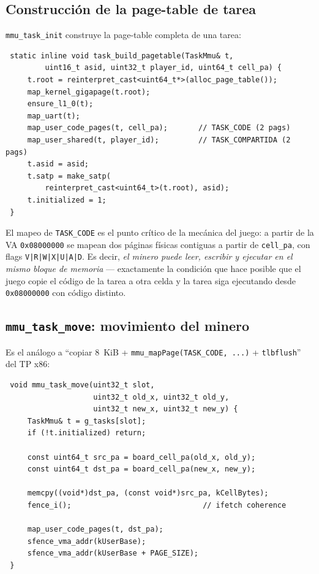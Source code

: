 \subsection{Construcción de la page-table de tarea}

\texttt{mmu\_task\_init} construye la page-table completa de una tarea:

\begin{codesnippet}
\begin{verbatim}
 static inline void task_build_pagetable(TaskMmu& t,
         uint16_t asid, uint32_t player_id, uint64_t cell_pa) {
     t.root = reinterpret_cast<uint64_t*>(alloc_page_table());
     map_kernel_gigapage(t.root);
     ensure_l1_0(t);
     map_uart(t);
     map_user_code_pages(t, cell_pa);       // TASK_CODE (2 pags)
     map_user_shared(t, player_id);         // TASK_COMPARTIDA (2 pags)
     t.asid = asid;
     t.satp = make_satp(
         reinterpret_cast<uint64_t>(t.root), asid);
     t.initialized = 1;
 }
\end{verbatim}
\end{codesnippet}

El mapeo de \texttt{TASK\_CODE} es el punto crítico de la mecánica del juego: a partir de la VA \texttt{0x08000000} se
mapean dos páginas físicas contiguas a partir de \texttt{cell\_pa}, con flags \texttt{V|R|W|X|U|A|D}. Es decir, \emph{el
minero puede leer, escribir y ejecutar en el mismo bloque de memoria} --- exactamente la condición que hace posible que
el juego copie el código de la tarea a otra celda y la tarea siga ejecutando desde \texttt{0x08000000} con código
distinto.

\subsection{\texttt{mmu\_task\_move}: movimiento del minero}

Es el análogo a ``copiar 8~KiB + \texttt{mmu\_mapPage(TASK\_CODE, ...)} + \texttt{tlbflush}'' del TP x86:

\begin{codesnippet}
\begin{verbatim}
 void mmu_task_move(uint32_t slot,
                    uint32_t old_x, uint32_t old_y,
                    uint32_t new_x, uint32_t new_y) {
     TaskMmu& t = g_tasks[slot];
     if (!t.initialized) return;

     const uint64_t src_pa = board_cell_pa(old_x, old_y);
     const uint64_t dst_pa = board_cell_pa(new_x, new_y);

     memcpy((void*)dst_pa, (const void*)src_pa, kCellBytes);
     fence_i();                              // ifetch coherence

     map_user_code_pages(t, dst_pa);
     sfence_vma_addr(kUserBase);
     sfence_vma_addr(kUserBase + PAGE_SIZE);
 }
\end{verbatim}
\end{codesnippet}

